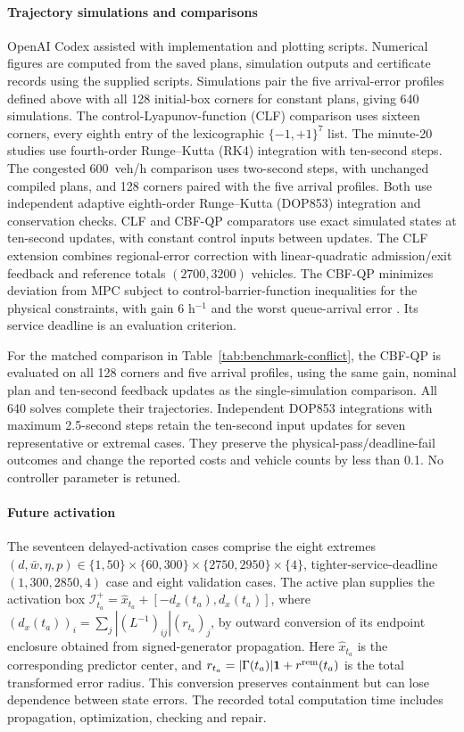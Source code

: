 \documentclass[final]{cas-sc}
\theoremstyle{definition}
\theoremstyle{plain}
\theoremstyle{definition}
\theoremstyle{plain}
\begin{document}
\paragraph{Trajectory simulations and comparisons}
OpenAI Codex assisted with implementation and plotting scripts.
Numerical figures are computed from the saved plans, simulation
outputs and certificate records using the supplied scripts.
Simulations pair the five arrival-error profiles defined above with
all 128 initial-box corners for constant plans, giving 640 simulations. The control-Lyapunov-function (CLF) comparison
uses sixteen corners,
every eighth entry of the lexicographic $\{-1,+1\}^7$ list.
The minute-20 studies use fourth-order Runge--Kutta
(RK4) integration with ten-second steps. The congested 600~veh/h
comparison uses two-second steps, with unchanged compiled plans,
and 128 corners paired with the five arrival profiles. Both use independent
adaptive eighth-order Runge--Kutta (DOP853) integration and conservation
checks. CLF and CBF-QP comparators use exact simulated states at ten-second
updates, with constant control inputs between updates.
The CLF extension combines regional-error correction with
linear-quadratic admission/exit feedback and reference totals
$(2700,3200)$ vehicles. The CBF-QP minimizes deviation from
MPC subject to control-barrier-function inequalities for the physical constraints, with gain $6$ h$^{-1}$
and the worst queue-arrival error \cite{ames2017}. Its service deadline
is an evaluation criterion. 

For the matched comparison in Table~\ref{tab:benchmark-conflict},
the CBF-QP is evaluated on all 128 corners and five arrival profiles,
using the same gain, nominal plan and ten-second feedback updates as
the single-simulation comparison. All 640 solves complete their
trajectories. Independent DOP853 integrations with maximum 2.5-second
steps retain the ten-second input updates for seven representative
or extremal cases. They preserve the physical-pass/deadline-fail
outcomes and change the reported costs and vehicle counts by less
than 0.1. No controller parameter is retuned.

\paragraph{Future activation}
\label{supp:detail:sec:delayed-handover-results}
\label{app:sequential-handover}
The seventeen delayed-activation cases comprise the eight extremes
$(d,\bar w,\eta,p)\in\{1,50\}\times\{60,300\}\times
\{2750,2950\}\times\{4\}$, tighter-service-deadline $(1,300,2850,4)$ case and eight
validation cases. The active plan supplies the activation box
$\mathcal I_{t_a}^+=\widehat x_{t_a}+[-d_x(t_a),d_x(t_a)]$, where
$(d_x(t_a))_i=\sum_j|(L^{-1})_{ij}|(r_{t_a})_j$, by outward conversion of its
endpoint enclosure obtained from signed-generator propagation. Here
$\widehat x_{t_a}$ is the corresponding predictor center, and
$r_{t_a}=|\Gamma(t_a)|\mathbf1+r^{\rm rem}(t_a)$ is the total
transformed error radius. This conversion preserves containment but can
lose dependence between state errors.
The recorded total computation time includes propagation,
optimization, checking and repair.
\end{document}

